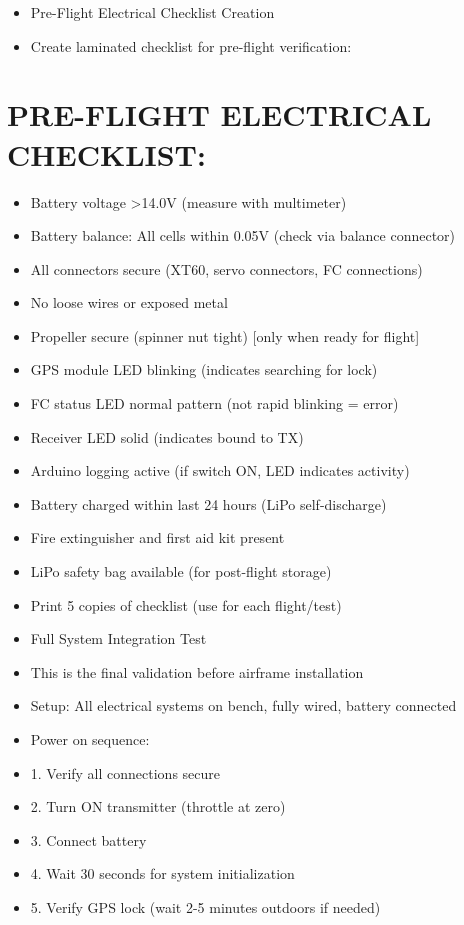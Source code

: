 \documentclass[11pt,letterpaper]{article}
\begin{document}
\begin{itemize}
  \item Pre-Flight Electrical Checklist Creation
  \item Create laminated checklist for pre-flight verification:
\end{itemize}

\section{PRE-FLIGHT ELECTRICAL CHECKLIST:}

\begin{itemize}
  \item Battery voltage >14.0V (measure with multimeter)
  \item Battery balance: All cells within 0.05V (check via balance connector)
  \item All connectors secure (XT60, servo connectors, FC connections)
  \item No loose wires or exposed metal
  \item Propeller secure (spinner nut tight) [only when ready for flight]
  \item GPS module LED blinking (indicates searching for lock)
  \item FC status LED normal pattern (not rapid blinking = error)
  \item Receiver LED solid (indicates bound to TX)
  \item Arduino logging active (if switch ON, LED indicates activity)
  \item Battery charged within last 24 hours (LiPo self-discharge)
  \item Fire extinguisher and first aid kit present
  \item LiPo safety bag available (for post-flight storage)
\end{itemize}

\begin{itemize}
  \item Print 5 copies of checklist (use for each flight/test)
\end{itemize}

\begin{itemize}
  \item Full System Integration Test
  \item [WARNING] This is the final validation before airframe installation
\end{itemize}

\begin{itemize}
  \item Setup: All electrical systems on bench, fully wired, battery connected
  \item Power on sequence:
  \item 1. Verify all connections secure
  \item 2. Turn ON transmitter (throttle at zero)
  \item 3. Connect battery
  \item 4. Wait 30 seconds for system initialization
  \item 5. Verify GPS lock (wait 2-5 minutes outdoors if needed)
\end{itemize}
\end{document}
